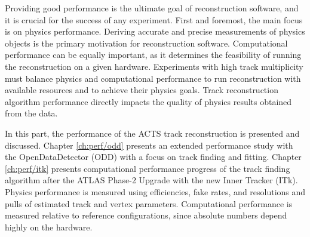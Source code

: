 Providing good performance is the ultimate goal of reconstruction software, and it is crucial for the success of any experiment. First and foremost, the main focus is on physics performance. Deriving accurate and precise measurements of physics objects is the primary motivation for reconstruction software. Computational performance can be equally important, as it determines the feasibility of running the reconstruction on a given hardware. Experiments with high track multiplicity must balance physics and computational performance to run reconstruction with available resources and to achieve their physics goals. Track reconstruction algorithm performance directly impacts the quality of physics results obtained from the data.

In this part, the performance of the ACTS track reconstruction is presented and discussed. Chapter \ref{ch:perf/odd} presents an extended performance study with the OpenDataDetector (ODD) with a focus on track finding and fitting. Chapter \ref{ch:perf/itk} presents computational performance progress of the track finding algorithm after the ATLAS Phase-2 Upgrade with the new Inner Tracker (ITk). Physics performance is measured using efficiencies, fake rates, and resolutions and pulls of estimated track and vertex parameters. Computational performance is measured relative to reference configurations, since absolute numbers depend highly on the hardware.
